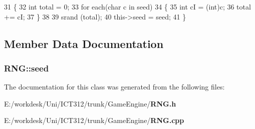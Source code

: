 \begin{DoxyCode}
31     \{
32         \textcolor{keywordtype}{int} total = 0;
33         \textcolor{keywordflow}{for each}(\textcolor{keywordtype}{char} c \textcolor{keywordflow}{in} seed)
34         \{
35             \textcolor{keywordtype}{int} cI = (int)c;
36             total += cI;
37         \}
38 
39         srand (total); 
40         this->seed = seed;
41     \}
\end{DoxyCode}


\subsection{Member Data Documentation}
\subsubsection[{seed}]{ R\+N\+G\+::seed\hspace{0.3cm}{\ttfamily [private]}}\label{class_r_n_g_aca53b8888746b89a972a197de72ad8fc}


The documentation for this class was generated from the following files\+:\begin{DoxyCompactItemize}
\item 
E\+:/workdesk/\+Uni/\+I\+C\+T312/trunk/\+Game\+Engine/{\bf R\+N\+G.\+h}\item 
E\+:/workdesk/\+Uni/\+I\+C\+T312/trunk/\+Game\+Engine/{\bf R\+N\+G.\+cpp}\end{DoxyCompactItemize}
